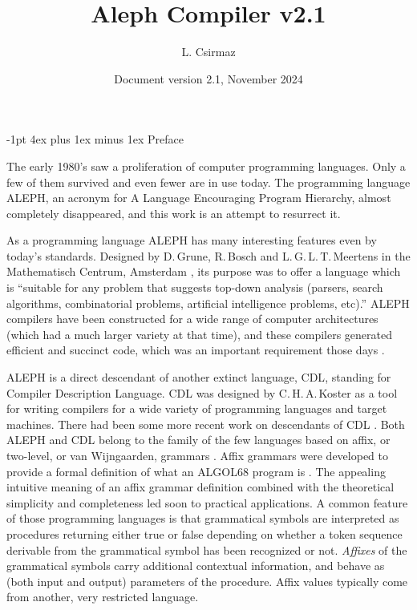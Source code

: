 \documentclass[titlepage]{article}
\title{\bf Aleph Compiler v2.1}
\author{L. Csirmaz}
\date{\normalsize Document version 2.1, November 2024}
\makeatletter
\newcommand\A{\textsf{ALEPH}}
\newcommand\g[1]{\textsf{\color{blue!90!black}#1}}
\renewcommand\section{%
\newpage
\@startsection{section}{1}{\z@}%
   {-1pt}%
   {4ex plus 1ex minus 1ex}%
   {\normalfont\Large\bfseries}}
\let\osection\section
\def\section {\newpage\osection}
\makeatother
\begin{document}
\thispagestyle{empty}
\maketitle
\newpage


\section{Preface}

The early 1980's saw a proliferation of computer programming languages. Only a
few of them survived and even fewer are in use today. The programming
language \A, an acronym for {\sf A} {\sf L}anguage {\sf E}ncouraging {\sf
P}rogram {\sf H}ierarchy, almost completely disappeared, and this work is an
attempt to resurrect it.

As a programming language \A{} has many interesting features even by today's
standards. Designed by D.\,Grune, R.\,Bosch and L.\,G.\,L.\,T.\,Meertens in
the Mathematisch Centrum, Amsterdam \cite{A-manual}, its purpose was to
offer a language which is ``suitable for any problem that suggests top-down
analysis (parsers, search algorithms, combinatorial problems, artificial
intelligence problems, etc).'' \A{} compilers have been constructed for a
wide range of computer architectures (which had a much larger variety at
that time), and these compilers generated efficient and succinct code, which
was an important requirement those days \cite{grune}.

\A{} is a direct descendant of another extinct language, \g{CDL}, standing
for {\sf C}ompiler {\sf D}escription {\sf L}anguage. \g{CDL} was designed by
C.\,H.\,A.\,Koster \cite{koster1,koster3} as a tool for writing compilers
for a wide variety of programming languages and target machines. There had
been some more recent work on descendants of \g{CDL} \cite{cdl3}. Both \A{}
and \g{CDL} belong to the family of the few languages based on affix, or
two-level, or van Wijngaarden, grammars \cite{koster2,wijn}. Affix grammars
were developed to provide a formal definition of what an \g{ALGOL68} program
is \cite{a68}. The appealing intuitive meaning of an affix grammar
definition combined with the theoretical simplicity and completeness led
soon to practical applications. A common feature of those programming
languages is that grammatical symbols are interpreted as procedures
returning either true or false depending on whether a token sequence
derivable from the grammatical symbol has been recognized or not.
\emph{Affixes} of the grammatical symbols carry additional contextual
information, and behave as (both input and output) parameters of the
procedure. Affix values typically come from another, very restricted
language.
\end{document}

